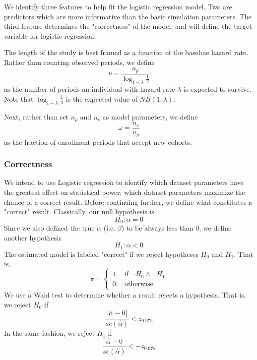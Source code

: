 We identify three features to help fit the logistic regression model. Two are predictors which are more informative than the basic simulation parameters. The third feature determines the "correctness" of the model, and will define the target variable for logistic regression.

The length of the study is best framed as a function of the baseline hazard rate. Rather than counting observed periods, we define
%
\begin{equation}
\label{eq:nu}
    \nu = \frac{n_p}{\log_{1-\lambda}\frac{1}{2}}  
\end{equation}
%
as the number of periods an individual with hazard rate $\lambda$ is expected to survive. Note that $\log_{1-\lambda}\frac{1}{2}$ is the expected value of $NB(1, \lambda)$. 

Next, rather than set $n_p$ and $n_c$ as model parameters, we define
%
\begin{equation}
\label{eq:omega}
    \omega = \frac{n_c}{n_p}    
\end{equation}
%
as the fraction of enrollment periods that accept new cohorts.

\subsubsection{Correctness}

We intend to use Logistic regression to identify which dataset parameters have the greatest effect on statistical power; which dataset parameters maximize the chance of a correct result. Before continuing further, we define what constitutes a "correct" result. Classically, our null hypothesis is
%
\begin{equation}
    H_0 : \alpha = 0 
\end{equation}
%
Since we also defined the true $\alpha$ (i.e. $\beta$) to be always less than 0, we define another hypothesis
%
\begin{equation}
    H_1 : \alpha < 0 
\end{equation}
%
The estimated model is labeled "correct" if we reject hypotheses $H_0$ and $H_1$. That is,
%
\begin{equation}
  \pi =
  \begin{cases}
    1, & \text{if } \neg H_0 \land \neg H_1 \\
    0, & \text{otherwise}
  \end{cases}
\end{equation}
%
We use a Wald test \cite{wald} to determine whether a result rejects a hypothesis. That is, we reject $H_0$ if 
%
\begin{equation}
 \frac{| \hat \alpha - 0 |}{se(\hat \alpha)} < z_{0.975}
\end{equation}
%
In the same fashion, we reject $H_1$ if\footnotemark
%
\begin{equation}
 \frac{ \hat \alpha - 0 }{se(\hat \alpha)} < -z_{0.975}
\end{equation}
%
